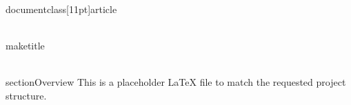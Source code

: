 \\documentclass[11pt]{article}
\begin{document}
\\maketitle

\\section{Overview}
This is a placeholder LaTeX file to match the requested project structure.

\
\end{document}
